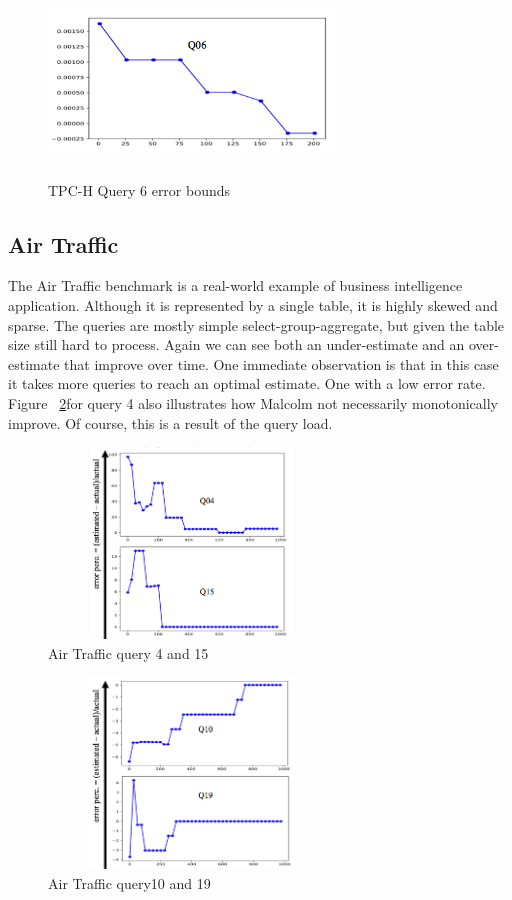 \documentclass[conference]{IEEEtran}
\begin{document}
\begin{figure}[t!]
	\centering
	\includegraphics[height=2in,width=3in]{Figures/Q6.png}
	\caption{TPC-H Query 6 error bounds
		\label{fig:q6}}
\end{figure}


\subsection{Air Traffic}
The Air Traffic benchmark is a real-world example of  business intelligence application.
Although it is represented by a single table, it is highly skewed and sparse.
The queries are mostly simple select-group-aggregate, but given the table size still hard to process.
Again we can see both an under-estimate and an over-estimate that improve over time.
One immediate observation is that in this case it takes more queries to reach an optimal estimate.
One with a low error rate.
Figure ~\ref{fig:4-15}for query 4  also illustrates how Malcolm not necessarily monotonically improve.
Of course, this is a result of the query load.

\begin{figure}[t!]
	\centering
	\includegraphics[height=2in,width=3in]{Figures/Q4-15.png}
	\caption{Air Traffic query 4 and 15
		\label{fig:4-15}}
\end{figure}

\begin{figure}[t!]
	\centering
	\includegraphics[height=2in,width=3in]{Figures/Q10-19.png}
	\caption{Air Traffic query10 and 19
		\label{fig:q10-19}}
\end{figure}
\end{document}
